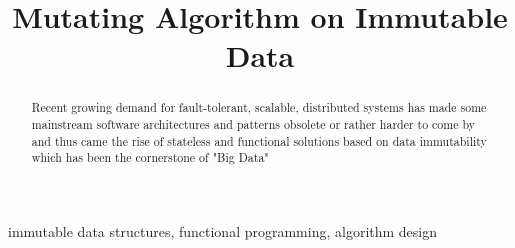 \documentclass[conference]{IEEEtran}
\begin{document}
\title{Mutating Algorithm on Immutable Data}

\author{
\and
{}
}

\maketitle



\begin{abstract}
    Recent growing demand for fault-tolerant, scalable, distributed systems has made some mainstream software architectures and patterns obsolete or rather harder to come by and thus came the rise of stateless and functional solutions based on data immutability which has been the cornerstone of "Big Data"

\end{abstract}

\begin{IEEEkeywords}
immutable data structures, functional programming, algorithm design
\end{IEEEkeywords}
\end{document}
